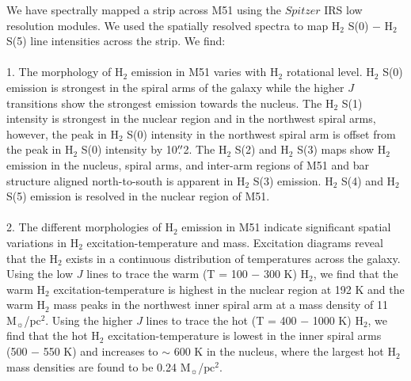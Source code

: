 \documentclass[manuscript]{aastex}
\begin{document}
We have spectrally mapped a strip across M51 using the $Spitzer$ IRS low resolution modules.  We used the spatially resolved spectra to map $\mathrm{H_2}$ S(0) $-$ $\mathrm{H_2}$ S(5) line intensities across the strip.  We find:\\
\\
1.  The morphology of $\mathrm{H_2}$ emission in M51 varies with $\mathrm{H_2}$ rotational level.  $\mathrm{H_2}$ S(0) emission is strongest in the spiral arms of the galaxy while the higher $J$ transitions show the strongest emission towards the nucleus.  The $\mathrm{H_2}$ S(1) intensity is strongest in the nuclear region and in the northwest spiral arms, however, the peak in $\mathrm{H_2}$ S(0) intensity in the northwest spiral arm is offset from the peak in $\mathrm{H_2}$ S(0) intensity by 10$\mbox{$.\!\!^{\prime\prime}$}$2.  The $\mathrm{H_2}$ S(2) and $\mathrm{H_2}$ S(3) maps show $\mathrm{H_2}$ emission in the nucleus, spiral arms, and inter-arm regions of M51 and bar structure aligned north-to-south is apparent in $\mathrm{H_2}$ S(3) emission.  $\mathrm{H_2}$ S(4) and $\mathrm{H_2}$ S(5) emission is resolved in the nuclear region of M51.\\  
\\
2.  The different morphologies of  $\mathrm{H_2}$ emission in M51 indicate significant spatial variations in $\mathrm{H_2}$ excitation-temperature and mass.  
Excitation diagrams reveal that the $\mathrm{H_2}$ exists in a continuous distribution of temperatures across the galaxy.  
Using the low $J$ lines to trace the warm (T = 100 $-$ 300 K) $\mathrm{H_2}$, we find that the warm  $\mathrm{H_2}$ excitation-temperature is highest in the nuclear region at 192 K and the warm $\mathrm{H_2}$ mass peaks in the northwest inner spiral arm at a mass density of 11 $\mathrm{M_\sun}$/$\mathrm{pc^2}$.  Using the higher $J$ lines to trace the hot (T = 400 $-$ 1000 K)  $\mathrm{H_2}$, we find that the hot $\mathrm{H_2}$ excitation-temperature is lowest in the inner spiral arms (500 $-$ 550 K) and increases to $\sim$ 600 K in the nucleus, where the largest hot $\mathrm{H_2}$ mass densities are found to be 0.24 $\mathrm{M_\sun}$/$\mathrm{pc^2}$.\\
\end{document}
